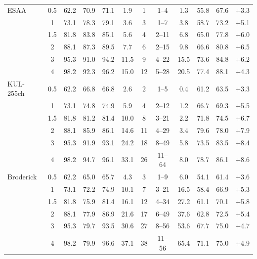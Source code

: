 \begin{tabular}{lccccccccccc}
\midrule
ESAA & 0.5 & 62.2 & 70.9 & 71.1 & 1.9 & 1 & 1--4 & 1.3 & 55.8 & 67.6 & +3.3 \\
 & 1 & 73.1 & 78.3 & 79.1 & 3.6 & 3 & 1--7 & 3.8 & 58.7 & 73.2 & +5.1 \\
 & 1.5 & 81.8 & 83.8 & 85.1 & 5.6 & 4 & 2--11 & 6.8 & 65.0 & 77.8 & +6.0 \\
 & 2 & 88.1 & 87.3 & 89.5 & 7.7 & 6 & 2--15 & 9.8 & 66.6 & 80.8 & +6.5 \\
 & 3 & 95.3 & 91.0 & 94.2 & 11.5 & 9 & 4--22 & 15.5 & 73.6 & 84.8 & +6.2 \\
 & 4 & 98.2 & 92.3 & 96.2 & 15.0 & 12 & 5--28 & 20.5 & 77.4 & 88.1 & +4.3 \\
\midrule
KUL-255ch & 0.5 & 62.2 & 66.8 & 66.8 & 2.6 & 2 & 1--5 & 0.4 & 61.2 & 63.5 & +3.3 \\
 & 1 & 73.1 & 74.8 & 74.9 & 5.9 & 4 & 2--12 & 1.2 & 66.7 & 69.3 & +5.5 \\
 & 1.5 & 81.8 & 81.2 & 81.4 & 10.0 & 8 & 3--21 & 2.2 & 71.8 & 74.5 & +6.7 \\
 & 2 & 88.1 & 85.9 & 86.1 & 14.6 & 11 & 4--29 & 3.4 & 79.6 & 78.0 & +7.9 \\
 & 3 & 95.3 & 91.9 & 93.1 & 24.2 & 18 & 8--49 & 5.8 & 73.5 & 83.5 & +8.4 \\
 & 4 & 98.2 & 94.7 & 96.1 & 33.1 & 26 & 11--64 & 8.0 & 78.7 & 86.1 & +8.6 \\
\midrule
Broderick & 0.5 & 62.2 & 65.0 & 65.7 & 4.3 & 3 & 1--9 & 6.0 & 54.1 & 61.4 & +3.6 \\
 & 1 & 73.1 & 72.2 & 74.9 & 10.1 & 7 & 3--21 & 16.5 & 58.4 & 66.9 & +5.3 \\
 & 1.5 & 81.8 & 75.9 & 81.4 & 16.1 & 12 & 4--34 & 27.2 & 61.1 & 70.1 & +5.8 \\
 & 2 & 88.1 & 77.9 & 86.9 & 21.6 & 17 & 6--49 & 37.6 & 62.8 & 72.5 & +5.4 \\
 & 3 & 95.3 & 79.7 & 93.5 & 30.6 & 27 & 8--56 & 53.6 & 67.7 & 75.0 & +4.7 \\
 & 4 & 98.2 & 79.9 & 96.6 & 37.1 & 38 & 11--56 & 65.4 & 71.1 & 75.0 & +4.9 \\
\bottomrule\end{tabular}
